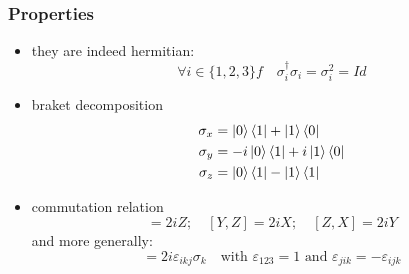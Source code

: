 \documentclass{article}
\begin{document}
\subsubsection*{Properties}
\begin{itemize}[label=-]
    \item they are indeed hermitian:
    \begin{equation}
        \forall i \in \{1, 2, 3\} f\quad \sigma_i^\dagger\sigma_i = \sigma_i^2 = Id
    \end{equation}
    \item braket decomposition
    \begin{equation}
        \begin{aligned}
            \sigma_x & = \ket{0}\bra{1} + \ket{1}\bra{0}
            \\
            \sigma_y & = -i\ket{0}\bra{1} + i\ket{1}\bra{0}
            \\
            \sigma_z & = \ket{0}\bra{1} - \ket{1}\bra{1}
        \end{aligned}
    \end{equation}
    \item commutation relation %
        \begin{equation}
            [X,Y] = 2iZ; \quad [Y, Z] = 2iX; \quad [Z,X] = 2iY
        \end{equation}
    and more generally:
        \begin{equation}
            [\sigma_i, \sigma_j] = 2i\varepsilon_{ikj}\sigma_k\quad\text{with }\varepsilon_{123} = 1 \text{ and } \varepsilon_{jik}=-\varepsilon_{ijk}
        \end{equation}

\end{itemize}
\end{document}
